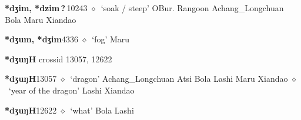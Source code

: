   \begin{list}{}{\leftmargin=1.5em \itemindent=-1.5em}
  \item {\footnotesize \textbf{*dʒim, *dzim\,?\,}}{\tiny 10243}
         $\diamond$~`soak / steep'
         OBur. 
\hspace{1ex}
         Rangoon 
\hspace{1ex}
         Achang\_Longchuan 
\hspace{1ex}
         Bola 
\hspace{1ex}
         Maru 
\hspace{1ex}
         Xiandao 
  \item {\footnotesize \textbf{*dʒum, *dʒim}}{\tiny 4336}
\hspace{1ex}
         $\diamond$~`fog'
         Maru 
  \end{list}
\item
\textbf{*dʒuŋH}
  {\tiny crossid 13057, 12622}
  \begin{list}{}{\leftmargin=1.5em \itemindent=-1.5em}
  \item {\footnotesize \textbf{*dʒuŋH}}{\tiny 13057}
         $\diamond$~`dragon'
         Achang\_Longchuan 
\hspace{1ex}
         Atsi 
\hspace{1ex}
         Bola 
\hspace{1ex}
         Lashi 
\hspace{1ex}
         Maru 
\hspace{1ex}
         Xiandao 
\hspace{1ex}
         $\diamond$~`year of the dragon'
         Lashi 
\hspace{1ex}
         Xiandao 
  \item {\footnotesize \textbf{*dʒuŋH}}{\tiny 12622}
\hspace{1ex}
         $\diamond$~`what'
         Bola 
\hspace{1ex}
         Lashi 
  \end{list}
